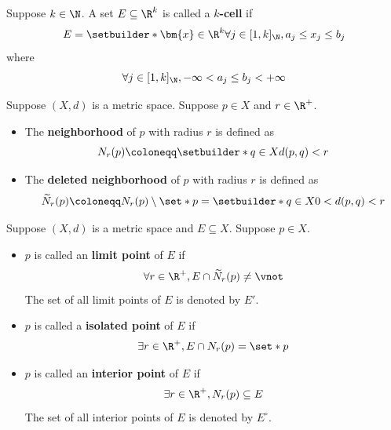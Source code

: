 \bigskip

\begin{definition} \label{an:def:k-cell}
  Suppose $k \in \N$. A set $E \subseteq \R^{k}$ is called a \textbf{$k$-cell} if
  \[
    E = \setbuilder*{\bm{x} \in \R^{k}}{\forall j \in [1, k]_{\N}, a_{j} \leq x_{j} \leq b_{j}}
  \]
  where
  \[
    \forall j \in [1, k]_{\N}, - \infty < a_{j} \leq b_{j} < + \infty
  \]
\end{definition}

\bigskip

\begin{definition} \label{an:def:neighborhood-open-ball}
  Suppose $(X, d)$ is a metric space. Suppose $p \in X$ and $r \in \R^{+}$.
  \begin{itemize}
    \item The \textbf{neighborhood} of $p$ with radius $r$ is defined as
          \[
            N_{r}(p) \coloneqq \setbuilder*{q \in X}{d(p, q) < r}
          \]
    \item The \textbf{deleted neighborhood} of $p$ with radius $r$ is defined as
          \[
            \widetilde{N}_{r}(p) \coloneqq N_{r}(p) \setminus \set*{p} = \setbuilder*{q \in X}{0 < d(p, q) < r}
          \]
  \end{itemize}
\end{definition}

\bigskip

\begin{definition} \label{an:def:limit-isolated-interior-points}
  Suppose $(X, d)$ is a metric space and $E \subseteq X$. Suppose $p \in X$.
  \begin{itemize}
    \item $p$ is called an \textbf{limit point} of $E$ if
          \[
            \forall r \in \R^{+}, E \cap \widetilde{N}_{r}(p) \neq \vnot
          \]
          The set of all limit points of $E$ is denoted by $E'$.
    \item $p$ is called a \textbf{isolated point} of $E$ if
          \[
            \exists r \in \R^{+}, E \cap N_{r}(p) = \set*{p}
          \]
    \item $p$ is called an \textbf{interior point} of $E$ if
          \[
            \exists r \in \R^{+}, N_{r}(p) \subseteq E
          \]
          The set of all interior points of $E$ is denoted by $E^{\circ}$.
  \end{itemize}
\end{definition}

\bigskip

